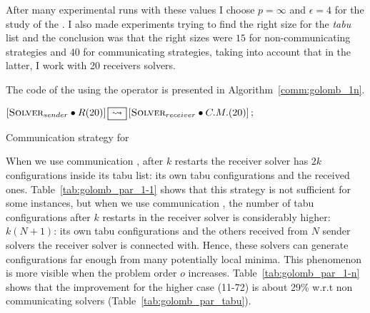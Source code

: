 {After many experimental runs with these values I choose $p = \infty$ and $\epsilon = 4$ for the study of the \commstr. I also made experiments trying to find the right size for the {\it tabu} list and the conclusion was that the right sizes were $15$ for non-communicating strategies and $40$ for communicating strategies, taking into account that in the latter, I work with 20 receivers solvers.
}



The \posl{} code of the \commstr{} using the \oneTn{} operator is presented in Algorithm~\ref{comm:golomb_1n}.

\begin{algorithm}[h]
\dontprintsemicolon
\SetNoline
$\left[\eqsolverposl{sender}\posldot R(20)\right] \oneton \left[\eqsolverposl{receiver}\posldot C.M.(20)\right];$
\caption{Communication strategy \oneTn{} for \GRP}\label{comm:golomb_1n}
\end{algorithm}

When we use communication \oneTone, after $k$ restarts the receiver solver has $2k$ configurations inside its tabu list: its own tabu configurations and the received ones. Table~\ref{tab:golomb_par_1-1} shows that this strategy is not sufficient for some instances, but when we use communication \oneTn, the number of tabu configurations after $k$ restarts in the receiver solver is considerably higher: $k(N+1)$: its own tabu configurations and the others received from $N$ sender solvers the receiver solver is connected with. Hence, these solvers can generate configurations far enough from many potentially local minima.
This phenomenon is more visible when the problem order $o$ increases. Table~\ref{tab:golomb_par_1-n} shows that the improvement for the higher case (11-72) is about 29\% w.r.t non communicating solvers (Table~\ref{tab:golomb_par_tabu}).

